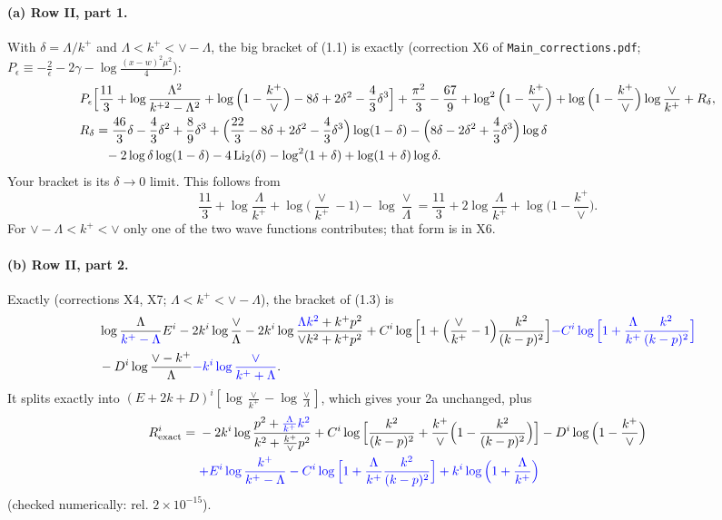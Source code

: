 \documentclass[10pt]{article}
\numberwithin{equation}{section}
\newcommand{\new}[1]{{\color{blue}#1}}
\begin{document}
\paragraph{(a) Row II, part 1.} With $\delta=\Lambda/k^+$ and $\Lambda<k^+<\vee-\Lambda$, the big bracket of (1.1) is exactly (correction X6 of \texttt{Main\_corrections.pdf}; $P_\epsilon\equiv-\frac2\epsilon-2\gamma-\log\frac{(x-w)^2\mu^2}{4}$):
\begin{align}
&P_\epsilon\Big[\frac{11}{3}+\log\frac{\Lambda^2}{k^{+2}-\Lambda^2}+\log\Big(1-\frac{k^+}{\vee}\Big)-8\delta+2\delta^2-\frac43\delta^3\Big]+\frac{\pi^2}{3}-\frac{67}{9}+\log^2\Big(1-\frac{k^+}{\vee}\Big)+\log\Big(1-\frac{k^+}{\vee}\Big)\log\frac{\vee}{k^+}+R_\delta,\notag\\
&R_\delta=\frac{46}{3}\delta-\frac43\delta^2+\frac89\delta^3+\Big(\frac{22}{3}-8\delta+2\delta^2-\frac43\delta^3\Big)\log(1-\delta)-\Big(8\delta-2\delta^2+\frac43\delta^3\Big)\log\delta\notag\\
&\qquad-2\log\delta\log(1-\delta)-4\,{\rm Li}_2(\delta)-\log^2(1+\delta)+\log(1+\delta)\log\delta.
\end{align}
Your bracket is its $\delta\to0$ limit. This follows from
\begin{equation}
\frac{11}{3}+\log\frac{\Lambda}{k^+}+\log\Big(\frac{\vee}{k^+}-1\Big)-\log\frac{\vee}{\Lambda}=\frac{11}{3}+2\log\frac{\Lambda}{k^+}+\log\Big(1-\frac{k^+}{\vee}\Big).
\end{equation}
For $\vee-\Lambda<k^+<\vee$ only one of the two wave functions contributes; that form is in X6.

\paragraph{(b) Row II, part 2.} Exactly (corrections X4, X7; $\Lambda<k^+<\vee-\Lambda$), the bracket of (1.3) is
\begin{align}
&\log\frac{\Lambda}{\new{k^+-\Lambda}}E^i-2k^i\log\frac{\vee}{\Lambda}-2k^i\log\frac{\new{\Lambda k^2}+k^+p^2}{\vee k^2+k^+p^2}+C^i\log\Big[1+\Big(\frac{\vee}{k^+}-1\Big)\frac{k^2}{(k-p)^2}\Big]\new{-C^i\log\Big[1+\frac{\Lambda}{k^+}\frac{k^2}{(k-p)^2}\Big]}\notag\\
&-D^i\log\frac{\vee-k^+}{\Lambda}\new{-k^i\log\frac{\vee}{k^++\Lambda}}.
\end{align}
It splits exactly into $(E+2k+D)^i[\log\frac{\vee}{k^+}-\log\frac{\vee}{\Lambda}]$, which gives your 2a unchanged, plus
\begin{align}
R^i_{\rm exact}={}&-2k^i\log\frac{p^2+\new{\frac{\Lambda}{k^+}k^2}}{k^2+\frac{k^+}{\vee}p^2}+C^i\log\Big[\frac{k^2}{(k-p)^2}+\frac{k^+}{\vee}\Big(1-\frac{k^2}{(k-p)^2}\Big)\Big]-D^i\log\Big(1-\frac{k^+}{\vee}\Big)\notag\\
&\new{+E^i\log\frac{k^+}{k^+-\Lambda}-C^i\log\Big[1+\frac{\Lambda}{k^+}\frac{k^2}{(k-p)^2}\Big]+k^i\log\Big(1+\frac{\Lambda}{k^+}\Big)}
\end{align}
(checked numerically: rel. $2\times10^{-15}$).
\end{document}
